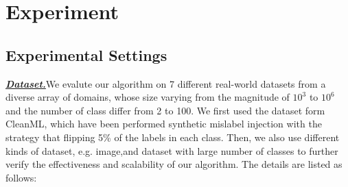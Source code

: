 \section{Experiment} 
\label{sec:exp}

\subsection{Experimental Settings}

\textbf{\textit{\underline{Dataset.}}}We evalute our algorithm on 7 different real-world datasets from a diverse array of domains, whose size varying from the magnitude of $10^{3}$ to $10^{6}$ and the number of class differ from 2 to 100. We first used the dataset form CleanML, which have been performed synthetic mislabel injection with the strategy that flipping 5\% of the labels in each class. Then, we also use different kinds of dataset, e.g. image,and dataset with large number of classes to further verify the effectiveness and scalability of our algorithm. The details are listed as follows:

